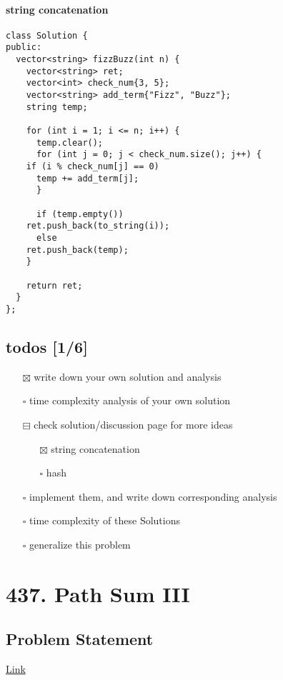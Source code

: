 \documentclass[12pt]{article}
\begin{document}
\paragraph{string concatenation}
\label{sec:orgcf18649}
\begin{verbatim}
class Solution {
public:
  vector<string> fizzBuzz(int n) {
    vector<string> ret;
    vector<int> check_num{3, 5};
    vector<string> add_term{"Fizz", "Buzz"};
    string temp;

    for (int i = 1; i <= n; i++) {
      temp.clear();
      for (int j = 0; j < check_num.size(); j++) {
	if (i % check_num[j] == 0)
	  temp += add_term[j];
      }

      if (temp.empty())
	ret.push_back(to_string(i));
      else
	ret.push_back(temp);
    }

    return ret;
  }
};
\end{verbatim}
\subsection{todos [1/6]}
\label{sec:orge919ee6}
\begin{itemize}
\item[{$\boxtimes$}] write down your own solution and analysis
\item[{$\square$}] time complexity analysis of your own solution
\item[{$\boxminus$}] check solution/discussion page for more ideas
\begin{itemize}
\item[{$\boxtimes$}] string concatenation
\item[{$\square$}] hash
\end{itemize}
\item[{$\square$}] implement them, and write down corresponding analysis
\item[{$\square$}] time complexity of these Solutions
\item[{$\square$}] generalize this problem
\end{itemize}
\section{437. Path Sum III}
\label{sec:org72794b3}
\subsection{Problem Statement}
\label{sec:orgbc98977}
\href{https://leetcode.com/problems/path-sum-iii/}{Link}
\end{document}
